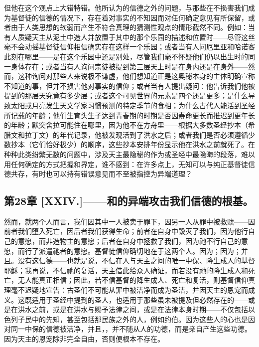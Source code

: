但他在这个观点上大错特错。他所认为的信德之外的问题，与那些在不损害我们成为基督徒的信德的情况下，存在着对事实的不知因而对任何确定意见有所保留，或者由于人类思想的软弱而产生不符合真理的猜测性观点的情形截然不同。例如：当有人质疑天主从泥土中造人并放置于其中的那个乐园的描述和位置时——尽管这丝毫不会动摇基督徒信仰相信确实存在这样一个乐园；或者当有人问厄里亚和哈诺客此刻在哪里——是在这个乐园中还是别处，尽管我们毫不怀疑他们仍以出生时的同一身体存在；或者当有人询问宗徒被提到第三层天上时是在身内还是在身外——然而，这种询问对那些人来说极不谦虚，他们想知道正是这奥秘本身的主体明确宣称不知道的事，但并不损害他对事实的信仰；或者当有人提出疑问：他告诉我们他被提到的那层天究竟有多少层；或者这个可见世界的元素是四个还是更多；是什么导致太阳或月亮发生天文学家习惯预测的特定季节的食相；为什么古代人能活到圣经所记载的年龄；他们生育头生子达到青春期的时期是否因寿命更长而推迟到更年长的年龄；默突舍拉可能住在哪里，因为他不在方舟里——根据大多数圣经抄本（希腊文和拉丁文）的年代记录，他被发现活到了洪水之后；或者我们是否必须遵循少数抄本（它们恰好极少）的顺序，这些抄本安排年份显示他在洪水之前就死了。在种种此类纷繁无数的问题中，涉及天主最隐秘的作为或圣经中最隐晦的段落，难以用任何确定的方式把握和界定，谁不感到：在许多点上，无知可以与纯正基督徒信德共存，有时也可以持有错误意见而不至被指控为异端道理？\par


\subsection{第28章 [XXIV.]——和的异端攻击我们信德的根基。}

然而，就两个人而言，我们因其中一人被卖于罪下，因另一人从罪中被救赎——因前者我们堕入死亡，因后者我们获得生命；前者在自身中毁灭了我们，因为他行自己的意愿，而非造物主的意愿；后者在自身中拯救了我们，因为祂不行自己的意愿，而行了派遣祂者的意愿。基督徒信仰确切地在于这两个人。因为；因为；并且。没有这信德——也就是说，不信在人与天主之间的唯一中保、降生成人的基督耶稣；我再说，不信祂的复活，天主借此给众人确证，而若没有祂的降生成人和死亡，无人能真正相信；因此，若不信基督的降生成人、死亡和复活，则基督信仰真理毫不迟疑地宣告：古圣们不可能从罪中被洁净而成为圣洁，并因天主的恩宠而成义。这既适用于圣经中提到的圣人，也适用于那些虽未被提及但必然存在的——或是在洪水之前，或是在洪水与赐予法律之间，或是在法律本身时期——不仅包括以色列子民中的先知，甚至包括那民族之外的人，例如约伯。因为这些人的心也是因对同一中保的信德被洁净，并且，，并不随从人的功德，而是亲自产生这些功德。因为天主的恩宠除非完全自由，否则便根本不存在。\par

